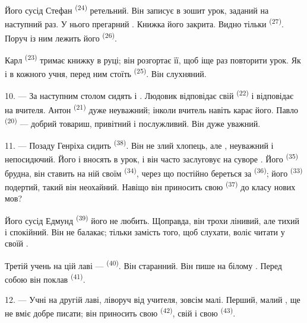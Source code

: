 Його сусід Стефан \textsuperscript{(24)} ретельний. Він записує в зошит урок,
заданий на наступний раз. У нього прегарний . Книжка його
закрита. Видно тільки  \textsuperscript{(27)}. Поруч із ним
лежить його  \textsuperscript{(26)}.

Карл \textsuperscript{(23)} тримає книжку в руці; він розгортає її, щоб іще раз
повторити урок. Як і в кожного учня, перед ним стоїть 
\textsuperscript{(25)}. Він слухняний.

10. --- За наступним столом сидять  і .
Людовик відповідає свій  \textsuperscript{(22)} і відповідає на
 вчителя. Антон \textsuperscript{(21)} дуже неуважний; інколи
вчитель навіть карає його. Павло \textsuperscript{(20)} --- добрий товариш,
привітний і послужливий. Він дуже уважний.

\VUsaut{4.2mm}
\VUsaut{3.2mm}

11. --- Позаду Генріха сидить  \textsuperscript{(38)}. Він не
злий хлопець, але , неуважний і непосидючий. Його
 і  вносять  в урок,
і він часто заслуговує на суворе . Його 
\textsuperscript{(35)} брудна, він ставить на ній  своїм
 \textsuperscript{(34)}, через що постійно береться за
 \textsuperscript{(36)}; його 
\textsuperscript{(33)} подертий, такий він неохайний. Навіщо він приносить свою
 \textsuperscript{(37)} до класу нових мов?

Його сусід Едмунд \textsuperscript{(39)} його не любить. Щоправда, він трохи
лінивий, але тихий і спокійний. Він не балакає; тільки замість того, щоб
слухати, воліє читати  у своїй .

Третій учень на цій лаві ---  \textsuperscript{(40)}. Він
старанний. Він пише на білому . Перед собою він поклав
 \textsuperscript{(41)}.

12. --- Учні на другій лаві, ліворуч від учителя, зовсім малі. Перший, малий
, ще не вміє добре писати; він приносить свою  \textsuperscript{(42)}, свій  і свою 
\textsuperscript{(43)}.

